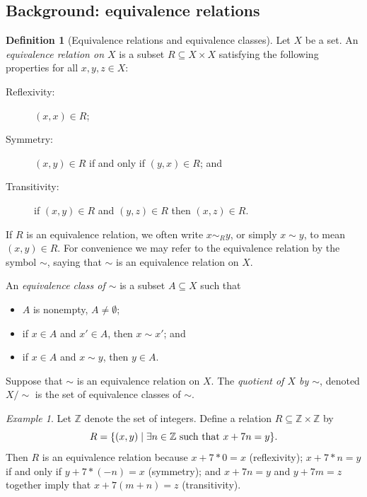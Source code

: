 \documentclass{book}
\def\tn{\textnormal}
\def\ZZ{{\mathbb Z}}
\def\ss{\subseteq}
\def\|{{\;|\;}}
\theoremstyle{remark}
\newtheorem{example}[subsubsection]{Example}
\theoremstyle{definition}
\newtheorem{definition}[subsubsection]{Definition}
\begin{document}

\subsection{Background: equivalence relations}

\begin{definition}[Equivalence relations and equivalence classes]

Let $X$ be a set. An {\em equivalence relation on $X$} is a subset $R\ss X\times X$ satisfying the following properties for all $x,y,z\in X$:
\begin{description}
\item[Reflexivity:] $(x,x)\in R$;
\item[Symmetry:] $(x,y)\in R$ if and only if $(y,x)\in R$; and
\item[Transitivity:] if $(x,y)\in R$ and $(y,z)\in R$ then $(x,z)\in R$.
\end{description}
If $R$ is an equivalence relation, we often write $x\sim_R y$, or simply $x\sim y$, to mean $(x,y)\in R$. For convenience we may refer to the equivalence relation by the symbol $\sim$, saying that $\sim$ is an equivalence relation on $X$.

An {\em equivalence class of $\sim$} is a subset $A\ss X$ such that
\begin{itemize}
\item $A$ is nonempty, $A\neq\emptyset$;
\item if $x\in A$ and $x'\in A$, then $x\sim x'$; and 
\item if $x\in A$ and $x\sim y$, then $y\in A$.
\end{itemize}
Suppose that $\sim$ is an equivalence relation on $X$. The {\em quotient of $X$ by $\sim$}, denoted $X/\sim$ is the set of equivalence classes of $\sim$.

\end{definition}

\begin{example}

Let $\ZZ$ denote the set of integers. Define a relation $R\ss\ZZ\times\ZZ$ by $$R=\{(x,y)\|\exists n\in\ZZ \tn{ such that } x+7n=y\}.$$ Then $R$ is an equivalence relation because $x+7*0=x$ (reflexivity); $x+7*n=y$ if and only if $y+7*(-n)= x$ (symmetry); and $x+7n=y$ and $y+7m=z$ together imply that $x+7(m+n)=z$ (transitivity).

\end{example}
\end{document}
